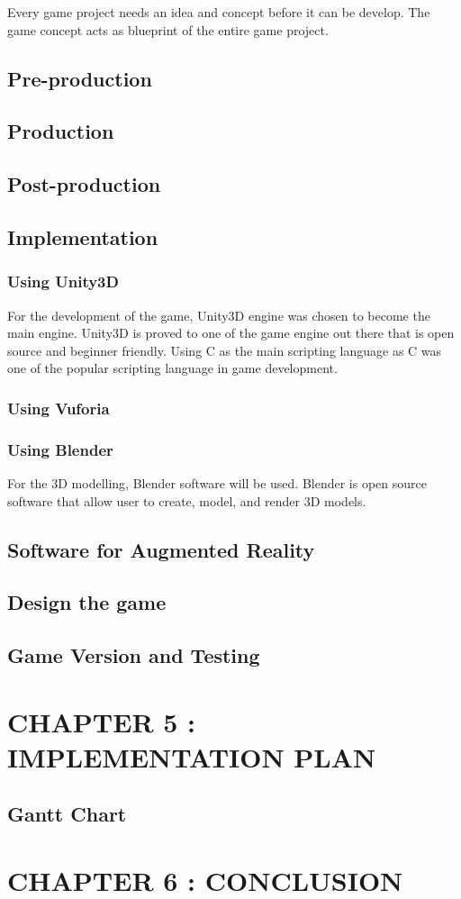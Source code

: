 \documentclass[12pt]{article}
\begin{document}
Every game project needs an idea and concept before it can be develop. The game concept acts as blueprint of the entire game project.

\subsection{Pre-production}

\subsection{Production}
\subsection{Post-production}
\subsection{Implementation}
\subsubsection{Using Unity3D}
For the development of the  game, Unity3D engine was chosen to become the main engine. Unity3D is proved to one of the game engine out there that is open source and beginner friendly. Using C as the main scripting language as C was one of the popular scripting language in game development. 
\subsubsection{Using Vuforia}
\subsubsection{Using Blender}
For the 3D modelling, Blender software will be used. Blender is open source software that allow user to create, model, and render 3D models. 
\subsection{Software for Augmented Reality}
\subsection{Design the game}
\subsection{Game Version and Testing}

\pagebreak

\section{CHAPTER 5 : IMPLEMENTATION PLAN}
\subsection{Gantt Chart}
\pagebreak

\section{CHAPTER 6 : CONCLUSION}
\pagebreak



\end{document}
